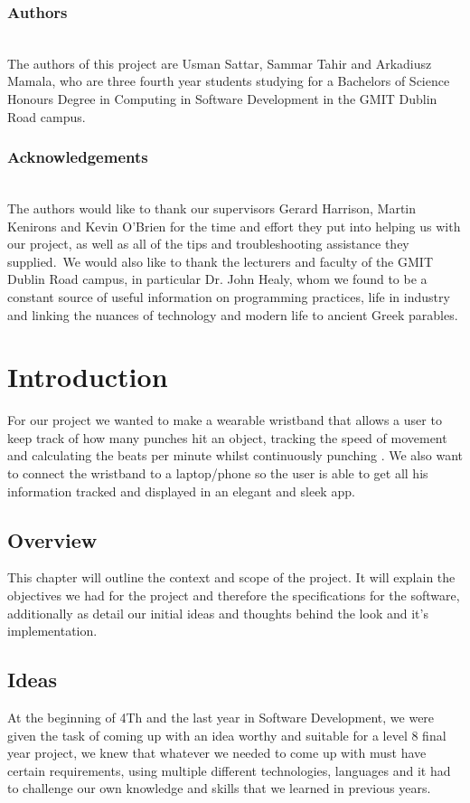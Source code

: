 \documentclass[a4paper,12pt]{report}
\begin{document}
\subsection*{Authors}
\\
The authors of this project are Usman Sattar, Sammar Tahir and
Arkadiusz Mamala, who are three fourth year students studying for a
Bachelors of Science Honours Degree in Computing in Software
Development in the GMIT Dublin Road campus.
    
\subsection*{Acknowledgements}
\\
The authors would like to thank our supervisors Gerard Harrison, Martin Kenirons and Kevin O’Brien for the time and effort they put into helping us with our project, as well as all of the tips and troubleshooting assistance they supplied.\ 
We would also like to thank the lecturers and faculty of the GMIT Dublin Road campus, in particular Dr. John Healy, whom we found to be a constant source of useful information on programming practices, life in industry and linking the nuances of technology and modern life to ancient Greek parables.

\body

\chapter{Introduction}
For our project we wanted to make a wearable wristband that allows a user to keep track of how many punches hit an object, tracking the speed of movement and calculating the beats per minute whilst continuously punching . We also want to connect the wristband to a laptop/phone so the user is able to get all his information tracked and displayed in an elegant and sleek app.

\section{Overview}
This chapter will outline the context and scope of the project. It
will explain the objectives we had for the project and therefore the specifications for the software, additionally as detail our initial ideas and thoughts
behind the look and it’s implementation.

\section{Ideas}
At the beginning of 4Th and the last year in Software Development, we were given the task of coming up with an idea worthy and suitable for a level 8 final year project, we knew that whatever we needed to come up with must have certain requirements, using multiple different technologies, languages and it had to challenge our own knowledge and skills that we learned in previous years.
\end{document}
